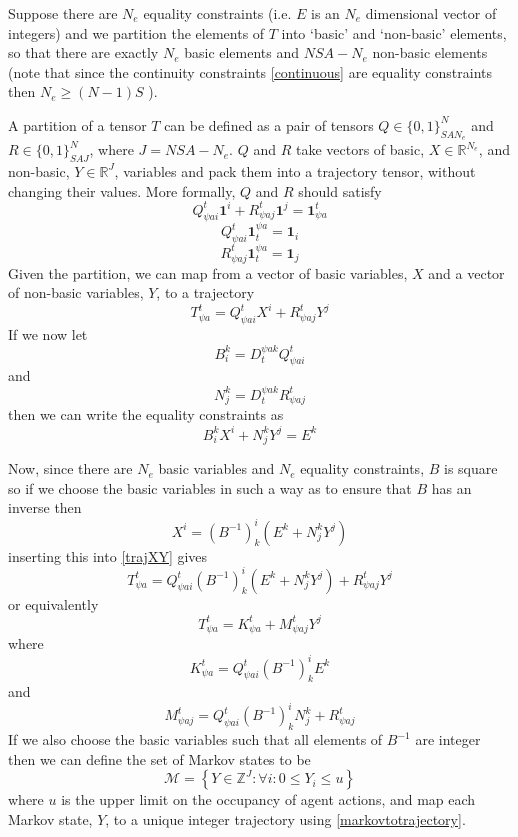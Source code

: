 \documentclass{article}
\begin{document}
Suppose there are $N_e$ equality constraints (i.e. $E$ is an $N_e$ dimensional vector of integers) and we partition the elements of $T$ into `basic' and `non-basic' elements, so that there are exactly $N_e$ basic elements and $NSA - N_e$ non-basic elements (note that since the continuity constraints \eqref{continuous} are equality constraints then $N_e \ge (N-1)S$ ).

A partition of a tensor $T$ can be defined as a pair of tensors $Q\in\{0,1\}_{SAN_e}^{N}$ and $R\in\{0,1\}_{SAJ}^{N}$, where $J=NSA - N_e$. $Q$ and $R$ take vectors of basic, $X\in\mathbb{R}^{N_e}$, and non-basic, $Y\in\mathbb{R}^J$, variables and pack them into a trajectory tensor, without changing their values. More formally, $Q$ and $R$ should satisfy
 \[
Q_{\psi ai}^{t} \mathbf{1}^i + R_{ \psi  aj}^{t} \mathbf{1}^j =  \mathbf{1}^t_{\psi a}
 \]
 \[
Q_{\psi ai}^{t} \mathbf{1}_t^{\psi a} = \mathbf{1}_i
 \]
 \[
R_{\psi aj}^{t} \mathbf{1}_t^{\psi a} = \mathbf{1}_j
\]
Given the partition, we can map from a vector of basic variables, $X$ and a vector of non-basic variables, $Y$, to a trajectory
\begin{equation}
T^{t}_{\psi a} =  Q_{\psi ai}^{t} X^i + R_{ \psi  aj}^{t} Y^j
\label{trajXY}
\end{equation}
If we now let
\begin{equation}
B_i^k = D^{\psi ak}_{t}Q_{\psi a i}^{t}
\label{Bmatrix}
\end{equation}
and
\[
N_j^k = D^{\psi ak}_{t}R_{\psi aj}^{t}
\]
then we can write the equality constraints as
\begin{equation}
B_i^kX^i + N_j^kY^j = E^k
\label{eqconstraints}
\end{equation}

Now, since there are $N_e$ basic variables and $N_e$ equality constraints, $B$ is square so if we choose the basic variables in such a way as to ensure that $B$ has an inverse then
\begin{equation}
X^i = (B^{-1})^i_k(E^k + N_j^kY^j)
\label{basicvars}
\end{equation}
inserting this into \eqref{trajXY} gives
\begin{equation}
T^t_{\psi a} =  Q_{\psi ai}^{t}(B^{-1})^i_k(E^k + N_j^kY^j) + R_{\psi aj}^{t } Y^j
\label{markovtotrajectorytensor}
\end{equation}
or equivalently
\begin{equation}
T^t_{\psi a} =  K^t_{\psi a} + M^{t}_{\psi aj} Y^j
\label{markovtotrajectory}
\end{equation}
where
\[
K^t_{\psi a} = Q_{\psi ai}^{t} (B^{-1})^i_kE^k
\]
and
\[
M^{t}_{\psi aj} = Q_{\psi ai}^{t} (B^{-1})^i_kN_j^k + R_{\psi aj}^{t}
\]
If we also choose the basic variables such that all elements of $B^{-1}$ are integer then we can define the set of Markov states to be
\[
\mathcal{M} = \left\{ Y \in \mathbb{Z}^J: \forall i:0 \le Y_i \le u \right\}
\]
where $u$ is the upper limit on the occupancy of agent actions, and map each Markov state, $Y$, to a unique integer trajectory using \eqref{markovtotrajectory}.
\end{document}
